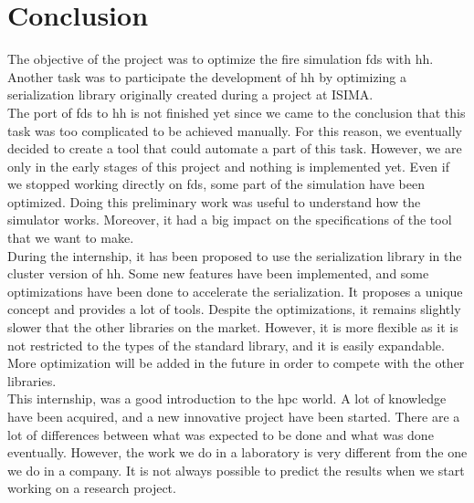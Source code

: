 
\newpage
\section*{Conclusion}

The objective of the project was to optimize the fire simulation \gls{fds} with
\gls{hh}. Another task was to participate the development of \gls{hh} by
optimizing a serialization library originally created during a project at
ISIMA.\\

The port of \gls{fds} to \gls{hh} is not finished yet since we came to the
conclusion that this task was too complicated to be achieved manually. For this
reason, we eventually decided to create a tool that could automate a part of
this task. However, we are only in the early stages of this project and nothing
is implemented yet. Even if we stopped working directly on \gls{fds}, some part
of the simulation have been optimized. Doing this preliminary work was useful to
understand how the simulator works. Moreover, it had a big impact on the
specifications of the tool that we want to make.\\

During the internship, it has been proposed to use the serialization library in
the cluster version of \gls{hh}. Some new features have been implemented, and
some optimizations have been done to accelerate the serialization. It proposes a
unique concept and provides a lot of tools. Despite the optimizations, it
remains slightly slower that the other libraries on the market. However, it is
more flexible as it is not restricted to the types of the standard library, and
it is easily expandable. More optimization will be added in the future in order
to compete with the other libraries.\\

This internship, was a good introduction to the \gls{hpc} world. A lot of
knowledge have been acquired, and a new innovative project have been started.
There are a lot of differences between what was expected to be done and what was
done eventually. However, the work we do in a laboratory is very different from
the one we do in a company. It is not always possible to predict the results
when we start working on a research project.

\label{lastPage}
\newpage
\pagestyle{empty}
